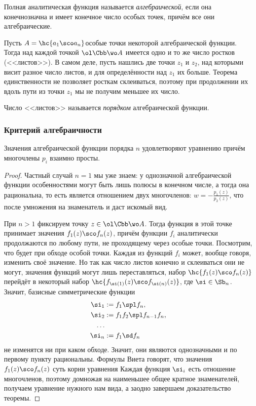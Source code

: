 \documentclass[a4paper]{article}
\begin{document}
\begin{df}
Полная аналитическая функция называется \emph{алгебраической}, если она конечнозначна и имеет конечное число
особых точек, причём все они алгебраические.
\end{df}

Пусть $A = \hc{a_1\sco a_n}$\т особые точки некоторой алгебраической функции. Тогда над каждой точкой $\ol\Cbb\wo A$ имеется
одно и то же число ростков (<<листов>>). В самом деле, пусть нашлись две точки $z_1$ и $z_2$, над которыми висит
разное число листов, и для определённости над $z_1$ их больше. Теорема единственности не позволяет росткам склеиваться,
поэтому при продолжении их вдоль пути из точки $z_1$ мы не получим меньшее их число.

\begin{df}
Число <<листов>> называется \emph{порядком} алгебраической функции.
\end{df}

\subsubsection{Критерий алгебраичности}

\begin{theorem}Значения алгебраической функции порядка $n$ удовлетворяют уравнению
причём многочлены $p_i$ взаимно просты.
\end{theorem}
\begin{proof}
 Частный случай $n=1$ мы уже знаем: у однозначной алгебраической функции особенностями могут быть
лишь полюсы в конечном числе, а тогда она рациональна, то есть является отношением двух многочленов:
$w = -\frac{p_1(z)}{p_2(z)}$, что после умножения на знаменатель и даст искомый вид.

 При $n > 1$ фиксируем точку $z\in \ol\Cbb\wo A$. Тогда функция в этой точке принимает значения $f_1(z)\sco f_n(z)$,
причём функции $f_i$ аналитически продолжаются по любому пути, не проходящему через особые точки. Посмотрим, что будет
при обходе особой точки. Каждая из функций $f_i$ может, вообще говоря, изменить своё значение. Но так как число листов
конечно и склеиваться они не могут, значения функций могут лишь переставляться,  набор $\hc{f_1(z)\sco f_n(z)}$
перейдёт в некоторый набор $\hc{f_{\si(1)}(z)\sco f_{\si(n)}(z)}$, где $\si \in \Sb_n$. Значит, базисные
симметрические функции
\begin{align*}
\si_1 & := f_1 \spl f_n,\\
\si_2 & := f_1f_2 \spl f_{n-1}f_n,\\
\dots\\
\si_n & := f_1\sd f_n
\end{align*}
не изменятся ни при каком обходе. Значит, они являются однозначными и по первому пункту рациональны. Формулы
Виета говорят, что значения $f_1(z)\sco f_n(z)$ суть корни уравнения
Каждая функция $\si_i$ есть отношение многочленов, поэтому домножая на наименьшее общее кратное знаменателей,
получаем уравнение нужного нам вида, а заодно завершаем доказательство теоремы.
\end{proof}
\end{document}
